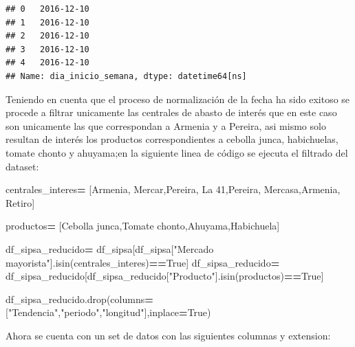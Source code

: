 \documentclass[
]{book}
\newenvironment{Shaded}{\begin{snugshade}}{\end{snugshade}}
\newcommand{\NormalTok}[1]{#1}
\newcommand{\OperatorTok}[1]{\textcolor[rgb]{0.81,0.36,0.00}{\textbf{#1}}}
\newcommand{\StringTok}[1]{\textcolor[rgb]{0.31,0.60,0.02}{#1}}
\newcommand{\VariableTok}[1]{\textcolor[rgb]{0.00,0.00,0.00}{#1}}
\begin{document}
\begin{verbatim}
## 0   2016-12-10
## 1   2016-12-10
## 2   2016-12-10
## 3   2016-12-10
## 4   2016-12-10
## Name: dia_inicio_semana, dtype: datetime64[ns]
\end{verbatim}

Teniendo en cuenta que el proceso de normalización de la fecha ha sido exitoso se procede a filtrar unicamente las centrales de abasto de interés que en este caso son unicamente las que correspondan a Armenia y a Pereira, asi mismo solo resultan de interés los productos correspondientes a cebolla junca, habichuelas, tomate chonto y ahuyama;en la siguiente linea de código se ejecuta el filtrado del dataset:

\begin{Shaded}
\begin{Highlighting}[]

\NormalTok{centrales\_interes}\OperatorTok{=}\NormalTok{ [}\StringTok{\textquotesingle{}Armenia, Mercar\textquotesingle{}}\NormalTok{,}\StringTok{\textquotesingle{}Pereira, La 41\textquotesingle{}}\NormalTok{,}\StringTok{\textquotesingle{}Pereira, Mercasa\textquotesingle{}}\NormalTok{,}\StringTok{\textquotesingle{}Armenia, Retiro\textquotesingle{}}\NormalTok{]}

\NormalTok{productos}\OperatorTok{=}\NormalTok{ [}\StringTok{\textquotesingle{}Cebolla junca\textquotesingle{}}\NormalTok{,}\StringTok{\textquotesingle{}Tomate chonto\textquotesingle{}}\NormalTok{,}\StringTok{\textquotesingle{}Ahuyama\textquotesingle{}}\NormalTok{,}\StringTok{\textquotesingle{}Habichuela\textquotesingle{}}\NormalTok{]}

\NormalTok{df\_sipsa\_reducido}\OperatorTok{=}\NormalTok{ df\_sipsa[df\_sipsa[}\StringTok{"Mercado mayorista"}\NormalTok{].isin(centrales\_interes)}\OperatorTok{==}\VariableTok{True}\NormalTok{]}
\NormalTok{df\_sipsa\_reducido}\OperatorTok{=}\NormalTok{ df\_sipsa\_reducido[df\_sipsa\_reducido[}\StringTok{"Producto"}\NormalTok{].isin(productos)}\OperatorTok{==}\VariableTok{True}\NormalTok{]}

\NormalTok{df\_sipsa\_reducido.drop(columns}\OperatorTok{=}\NormalTok{[}\StringTok{"Tendencia"}\NormalTok{,}\StringTok{"periodo"}\NormalTok{,}\StringTok{"longitud"}\NormalTok{],inplace}\OperatorTok{=}\VariableTok{True}\NormalTok{)}
\end{Highlighting}
\end{Shaded}

Ahora se cuenta con un set de datos con las siguientes columnas y extension:
\end{document}
